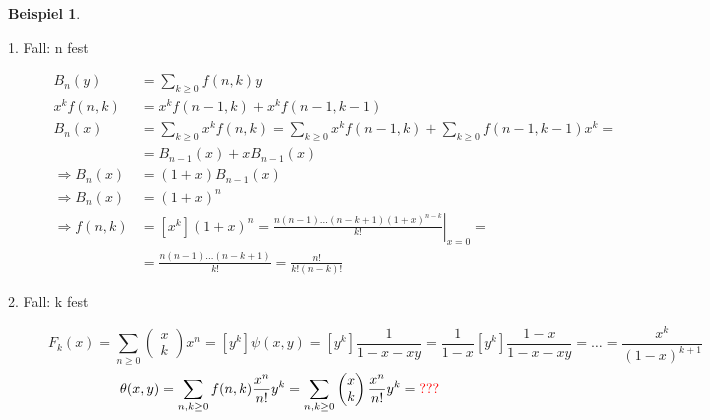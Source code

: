 \documentclass[a4paper,ngerman]{scrartcl}
\theoremstyle{definition}
\newtheorem{bsp}[defn]{Beispiel}
\theoremstyle{plain}
\theoremstyle{remark}
\newcommand{\XXX}[1]{\textcolor{red}{#1}}
\begin{document}
\begin{bsp}
\begin{description}
	\item[1. Fall: n fest]
	\begin{align*}
		B_n(y) 	&= \sum_{k \geq 0} f(n,k)y \\
	x^k f(n,k) 	&= x^k f(n-1,k) + x^k f(n-1,k-1) \\
		B_n(x) 	&= \sum_{k \geq 0} x^k f(n,k) = \sum_{k \geq 0} x^k f(n-1,k) + \sum_{k \geq 0} f(n-1,k -1) x^k = \\	
				&= B_{n-1}(x) + x B_{n-1}(x) \\
		\Rightarrow B_n(x) &= (1+x)B_{n-1}(x) \\
		\Rightarrow B_n(x) &= (1+x)^n \\
		\Rightarrow f(n,k) &= [x^k] (1+x)^n = \left.\frac{n(n-1)\dots(n-k+1)(1+x)^{n-k}}{k!}\right|_{x=0} = \\
				&= \frac{n(n-1) \dots (n-k+1)}{k!} = \frac{n!}{k!(n-k)!}
	\end{align*}

	\item[2. Fall: k fest]
	\[F_k(x) = \sum_{n \geq 0} \left(\begin{matrix}x \\ k\end{matrix}\right) x^n = [y^k]\psi(x,y) = [y^k] \frac{1}{1-x-xy} = \frac{1}{1-x}[y^k]\frac{1-x}{1-x-xy} = \dots = \frac{x^k}{(1-x)^{k+1}}\]
	\[\theta(x,y) = \sum_{n,k \geq 0}f(n,k)\frac{x^n}{n!}y^k = \sum_{n,k \geq 0} \left(\begin{matrix}x \\ k\end{matrix}\right) \frac{x^n}{n!}y^k = \XXX{???} \]

\end{description}
\end{bsp}
\end{document}

